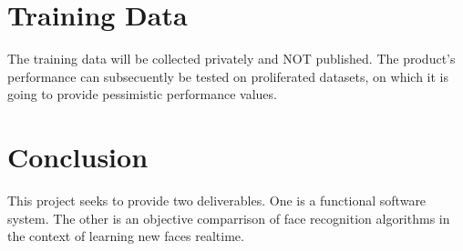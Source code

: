 \documentclass{article}
\begin{document}
\section{Training Data}
The training data will be collected privately and NOT published.
The product's performance can subsecuently be tested on proliferated datasets, on which it is going to provide pessimistic performance values.

\section{Conclusion}
This project seeks to provide two deliverables.
One is a functional software system.
The other is an objective comparrison of face recognition algorithms in the context of learning new faces realtime.
\end{document}
